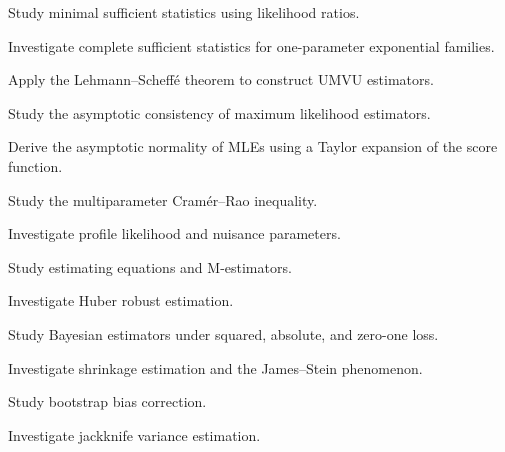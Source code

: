 \begin{exercise}[4]
Study minimal sufficient statistics using likelihood ratios.
\end{exercise}

\begin{exercise}[4]
Investigate complete sufficient statistics for one-parameter exponential
families.
\end{exercise}

\begin{exercise}[4]
Apply the Lehmann--Scheff\'e theorem to construct UMVU estimators.
\end{exercise}

\begin{exercise}[4]
Study the asymptotic consistency of maximum likelihood estimators.
\end{exercise}

\begin{exercise}[4]
Derive the asymptotic normality of MLEs using a Taylor expansion of the
score function.
\end{exercise}

\begin{exercise}[4]
Study the multiparameter Cram\'er--Rao inequality.
\end{exercise}

\begin{exercise}[4]
Investigate profile likelihood and nuisance parameters.
\end{exercise}

\begin{exercise}[4]
Study estimating equations and M-estimators.
\end{exercise}

\begin{exercise}[4]
Investigate Huber robust estimation.
\end{exercise}

\begin{exercise}[4]
Study Bayesian estimators under squared, absolute, and zero-one loss.
\end{exercise}

\begin{exercise}[4]
Investigate shrinkage estimation and the James--Stein phenomenon.
\end{exercise}

\begin{exercise}[4]
Study bootstrap bias correction.
\end{exercise}

\begin{exercise}[4]
Investigate jackknife variance estimation.
\end{exercise}

